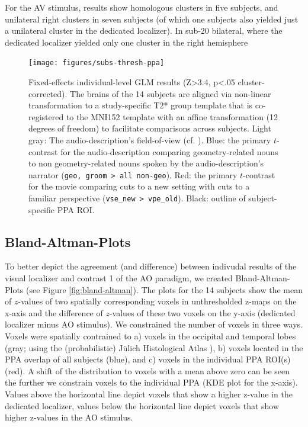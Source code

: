 \documentclass[english]{article}
\begin{document}
For the AV stimulus, results show homologous clusters in five subjects, and
unilateral right clusters in seven subjects (of which one subjects also yielded
just a unilateral cluster in the dedicated localizer).
In sub-20 bilateral, where the dedicated localizer yielded only one cluster in
the right hemisphere

\begin{figure} \centering
    \texttt{[image: figures/subs-thresh-ppa]}
    \caption{Fixed-effects individual-level GLM results (Z>3.4, p<.05
        cluster-corrected). The brains of the 14 subjects are aligned via
        non-linear transformation to a study-specific T2* group template that is
    co-registered to the MNI152 template with an affine transformation (12
degrees of freedom) to facilitate comparisons across subjects.
        Light gray: The audio-description's field-of-view
        (cf. \citep{hanke2014audiomovie}).
        Blue: the primary $t$-contrast for the audio-description comparing
        geometry-related nouns to non geometry-related nouns spoken by the
        audio-description's narrator (\texttt{geo, groom > all non-geo}).
        Red: the primary $t$-contrast for the movie comparing cuts to a new
        setting with cuts to a familiar perspective (\texttt{vse\_new >
        vpe\_old}).
        Black: outline of subject-specific PPA ROI.}
\label{fig:subs-thresh-ppa}
\end{figure}


\subsection{Bland-Altman-Plots}
To better depict the agreement (and difference) between indivudal results of the
visual localizer and contrast 1 of the AO paradigm, we created
Bland-Altman-Plots (see Figure \ref{fig:bland-altman}).
The plots for the 14 subjects show the mean of $z$-values of two spatially
corresponding voxels in unthresholded z-maps on the x-axis and the difference of
$z$-values of these two voxels on the y-axis (dedicated localizer minus AO
stimulus).
We constrained the number of voxels in three ways. Voxels were spatially
contrained to a) voxels in the occipital and temporal lobes (gray; using the
(probabilistic) Jülich Histological Atlas \citep{eickhoff2005toolbox,
eickhoff2007assignment}), b) voxels located in the PPA overlap of all subjects
(blue), and c) voxels in the individual PPA ROI(s)(red).
A shift of the distribution to voxels with a mean above zero can be seen the
further we constrain voxels to the individual PPA (KDE plot for the x-axis).
Values above the horizontal line depict voxels that show a higher z-value in the
dedicated localizer, values below the horizontal line depict voxels that show
higher z-values in the AO stimulus.
\end{document}
